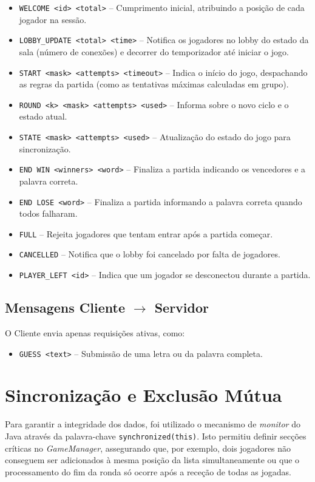 \documentclass[11pt,a4paper,oneside]{report}
\begin{document}
\begin{itemize}
    \item \texttt{WELCOME <id> <total>} – Cumprimento inicial, atribuindo a posição de cada jogador na sessão.
    \item \texttt{LOBBY\_UPDATE <total> <time>} – Notifica os jogadores no lobby do estado da sala (número de conexões) e decorrer do temporizador até iniciar o jogo.
    \item \texttt{START <mask> <attempts> <timeout>} – Indica o início do jogo, despachando as regras da partida (como as tentativas máximas calculadas em grupo).
    \item \texttt{ROUND <k> <mask> <attempts> <used>} – Informa sobre o novo ciclo e o estado atual.
    \item \texttt{STATE <mask> <attempts> <used>} – Atualização do estado do jogo para sincronização.
    \item \texttt{END WIN <winners> <word>} – Finaliza a partida indicando os vencedores e a palavra correta.
    \item \texttt{END LOSE <word>} – Finaliza a partida informando a palavra correta quando todos falharam.
    \item \texttt{FULL} – Rejeita jogadores que tentam entrar após a partida começar.
    \item \texttt{CANCELLED} – Notifica que o lobby foi cancelado por falta de jogadores.
    \item \texttt{PLAYER\_LEFT <id>} – Indica que um jogador se desconectou durante a partida.
\end{itemize}

\subsection{Mensagens Cliente $\rightarrow$ Servidor}
O Cliente envia apenas requisições ativas, como:

\begin{itemize}
    \item \texttt{GUESS <text>} – Submissão de uma letra ou da palavra completa.
\end{itemize}

\section{Sincronização e Exclusão Mútua}
Para garantir a integridade dos dados, foi utilizado o mecanismo de \textit{monitor} do Java através da palavra-chave \texttt{synchronized(this)}. Isto permitiu definir secções críticas no \textit{GameManager}, assegurando que, por exemplo, dois jogadores não conseguem ser adicionados à mesma posição da lista simultaneamente ou que o processamento do fim da ronda só ocorre após a receção de todas as jogadas.
\end{document}
